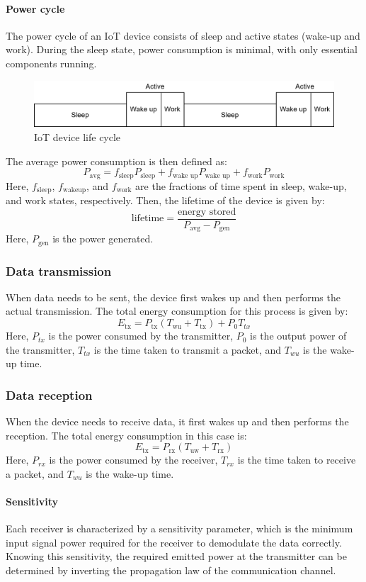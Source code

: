 \paragraph*{Power cycle}
The power cycle of an IoT device consists of sleep and active states (wake-up and work). 
During the sleep state, power consumption is minimal, with only essential components running.
\begin{figure}[H]
    \centering
    \includegraphics[width=0.75\linewidth]{images/iot5.png}
    \caption{IoT device life cycle}
\end{figure}
\noindent The average power consumption is then defined as:
\[P_{\text{avg}}=f_{\text{sleep}}P_{\text{sleep}}+f_{\text{wake up}}P_{\text{wake up}}+f_{\text{work}}P_{\text{work}}\]
Here, $f_{\text{sleep}}$, $f_{\text{wakeup}}$, and $f_{\text{work}}$ are the fractions of time spent in sleep, wake-up, and work states, respectively.
Then, the lifetime of the device is given by:
\[\text{lifetime}=\dfrac{\text{energy stored}}{P_{\text{avg}}-P_{\text{gen}}}\]
Here, $P_{\text{gen}}$ is the power generated.

\subsubsection{Data transmission}
When data needs to be sent, the device first wakes up and then performs the actual transmission. 
The total energy consumption for this process is given by:
\[E_\text{tx}=P_\text{tx}(T_\text{wu}+T_\text{tx})+P_0T_{tx}\]
\noindent Here, $P_{tx}$ is the power consumed by the transmitter, $P_0$ is the output power of the transmitter, $T_{tx}$ is the time taken to transmit a packet, and $T_{wu}$ is the wake-up time.

\subsubsection{Data reception}
When the device needs to receive data, it first wakes up and then performs the reception. 
The total energy consumption in this case is:
\[E_\text{tx}=P_\text{rx}(T_\text{uw}+T_\text{rx})\]
Here, $P_{rx}$ is the power consumed by the receiver, $T_{rx}$ is the time taken to receive a packet, and $T_{wu}$ is the wake-up time.

\paragraph*{Sensitivity}
Each receiver is characterized by a sensitivity parameter, which is the minimum input signal power required for the receiver to demodulate the data correctly. 
Knowing this sensitivity, the required emitted power at the transmitter can be determined by inverting the propagation law of the communication channel.

